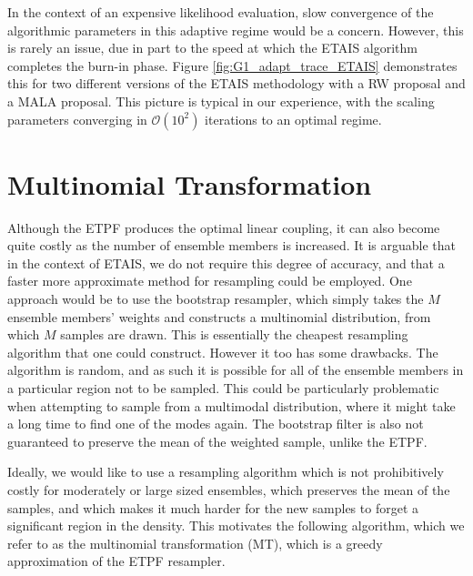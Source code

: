 \documentclass[final]{siamltex}
\begin{document}
In the context of an expensive likelihood evaluation, slow convergence
of the algorithmic parameters in this adaptive regime would be a
concern. However, this is rarely an issue, due in part to the speed at
which the ETAIS algorithm completes the burn-in phase. Figure
\ref{fig:G1_adapt_trace_ETAIS} demonstrates this for two different
versions of the ETAIS methodology with a RW proposal and a MALA\cite{roberts1998optimal}
proposal. This picture is typical in our experience, with the scaling
parameters converging in $\mathcal{O}(10^2)$ iterations to an optimal regime.

\section{Multinomial Transformation}\label{sec:MT}

Although the ETPF produces the optimal linear coupling, it can also become quite costly as the number of ensemble members
is increased. It is arguable that in the context of ETAIS, we do not
require this degree of accuracy, and that a faster more approximate
method for resampling could be employed. One approach would be to use
the bootstrap resampler, which simply takes the $M$ ensemble members'
weights and constructs a multinomial distribution, from which $M$
samples are drawn. This is essentially the cheapest resampling
algorithm that one could construct. However it too has some
drawbacks. The algorithm is random, and as such it is possible for all
of the ensemble members in a particular region not to be sampled. This
could be particularly problematic when attempting to sample from a
multimodal distribution, where it might take a long time to find one
of the modes again. The bootstrap filter is also not guaranteed to
preserve the mean of the weighted sample, unlike the ETPF.

Ideally, we would like to use a resampling algorithm which is not
prohibitively costly for moderately or large sized ensembles,
which preserves the mean of the samples, and which makes it much
harder for the new samples to forget a significant region in the
density. This motivates the following algorithm, which we refer to as the
multinomial transformation (MT), which is a greedy
approximation of the ETPF resampler.
\end{document}
